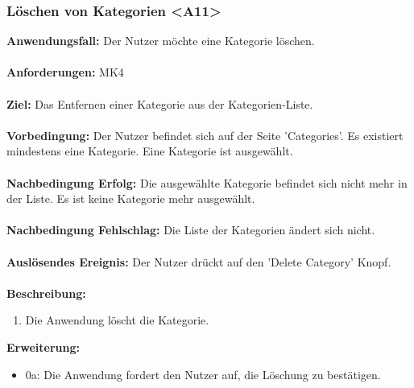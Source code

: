 \documentclass[parskip=full]{scrartcl} %
\begin{document}
\subsubsection*{Löschen von Kategorien <A11>}
\textbf{Anwendungsfall:} Der Nutzer möchte eine Kategorie löschen.\\\\
\textbf{Anforderungen:} MK4\\\\
\textbf{Ziel:} Das Entfernen einer Kategorie aus der Kategorien-Liste.\\\\
\textbf{Vorbedingung:} Der Nutzer befindet sich auf der Seite 'Categories'. Es existiert mindestens eine Kategorie. Eine Kategorie ist ausgewählt.\\\\
\textbf{Nachbedingung Erfolg:} Die ausgewählte Kategorie befindet sich nicht mehr in der Liste. Es ist keine Kategorie mehr ausgewählt.\\\\
\textbf{Nachbedingung Fehlschlag:} Die Liste der Kategorien ändert sich nicht.\\\\
\textbf{Auslösendes Ereignis:} Der Nutzer drückt auf den 'Delete Category' Knopf. \\\\
\textbf{Beschreibung:}
\begin{enumerate}
    \item Die Anwendung löscht die Kategorie.
\end{enumerate}
\textbf{Erweiterung:}
\begin{itemize}
    \item 0a: Die Anwendung fordert den Nutzer auf, die Löschung zu bestätigen.
\end{itemize}
\newpage
\end{document}
